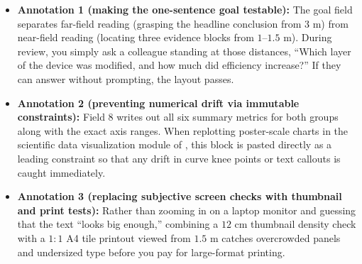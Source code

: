 
\begin{itemize}
  \item \textbf{Annotation 1 (making the one-sentence goal testable):} The goal field separates far-field reading (grasping the headline conclusion from $3\text{ m}$) from near-field reading (locating three evidence blocks from $1\text{--}1.5\text{ m}$). During review, you simply ask a colleague standing at those distances, ``Which layer of the device was modified, and how much did efficiency increase?'' If they can answer without prompting, the layout passes.
  \item \textbf{Annotation 2 (preventing numerical drift via immutable constraints):} Field 8 writes out all six summary metrics for both groups along with the exact axis ranges. When replotting poster-scale charts in the scientific data visualization module of \scidraw{}, this block is pasted directly as a leading constraint so that any drift in curve knee points or text callouts is caught immediately.
  \item \textbf{Annotation 3 (replacing subjective screen checks with thumbnail and print tests):} Rather than zooming in on a laptop monitor and guessing that the text ``looks big enough,'' combining a $12\text{ cm}$ thumbnail density check with a $1{:}1$ A4 tile printout viewed from $1.5\text{ m}$ catches overcrowded panels and undersized type before you pay for large-format printing.
\end{itemize}

